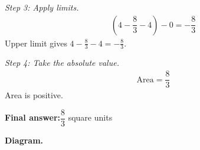 \documentclass[11pt]{article}
\begin{document}
\textit{Step 3: Apply limits.}
\[\begin{gathered}
\left(4 - \dfrac{8}{3} - 4\right) - 0 = -\dfrac{8}{3}
\end{gathered}\]
Upper limit gives \( 4 - \tfrac{8}{3} - 4 = -\tfrac{8}{3} \).

\textit{Step 4: Take the absolute value.}
\[\begin{gathered}
\text{Area} = \dfrac{8}{3}
\end{gathered}\]
Area is positive.

\begin{answerbox}
\textbf{Final answer:}\quad \(\displaystyle \dfrac{8}{3}\) square units
\end{answerbox}
\textbf{Diagram.}

\begin{center}
\end{center}
\end{document}
